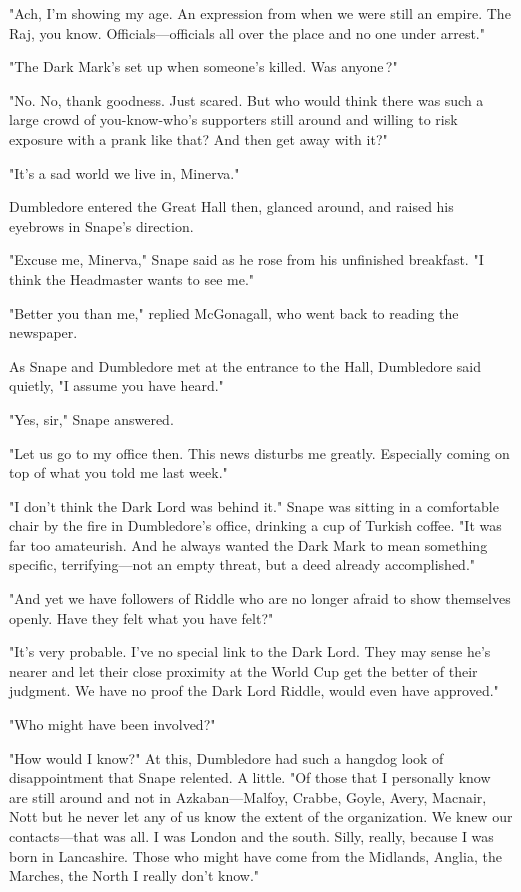 "Ach, I'm showing my age. An expression from when we were still an empire. The Raj, you know. Officials—officials all over the place and no one under arrest."

"The Dark Mark's set up when someone's killed. Was anyone{\el}\,?"

"No. No, thank goodness. Just scared. But who would think there was such a large crowd of you-know-who's supporters still around and willing to risk exposure with a prank like that? And then get away with it?"

"It's a sad world we live in, Minerva."

Dumbledore entered the Great Hall then, glanced around, and raised his eyebrows in Snape's direction.

"Excuse me, Minerva," Snape said as he rose from his unfinished breakfast. "I think the Headmaster wants to see me."

"Better you than me," replied McGonagall, who went back to reading the newspaper.

As Snape and Dumbledore met at the entrance to the Hall, Dumbledore said quietly, "I assume you have heard."

"Yes, sir," Snape answered.

"Let us go to my office then. This news disturbs me greatly. Especially coming on top of what you told me last week."

"I don't think the Dark Lord was behind it." Snape was sitting in a comfortable chair by the fire in Dumbledore's office, drinking a cup of Turkish coffee. "It was far too amateurish. And he always wanted the Dark Mark to mean something specific, terrifying—not an empty threat, but a deed already accomplished."

"And yet we have followers of{\el} Riddle{\el} who are no longer afraid to show themselves openly. Have they felt what you have felt?"

"It's very probable. I've no special link to the Dark Lord. They may sense he's nearer and let their close proximity at the World Cup get the better of their judgment. We have no proof the Dark Lord{\el} Riddle, would even have approved."

"Who might have been involved?"

"How would I know?" At this, Dumbledore had such a hangdog look of disappointment that Snape relented. A little. "Of those that I personally know are still around and not in Azkaban—Malfoy, Crabbe, Goyle, Avery, Macnair, Nott{\el} but he never let any of us know the extent of the organization. We knew our contacts—that was all. I was London and the south. Silly, really, because I was born in Lancashire. Those who might have come from the Midlands, Anglia, the Marches, the North{\el} I really don't know."

